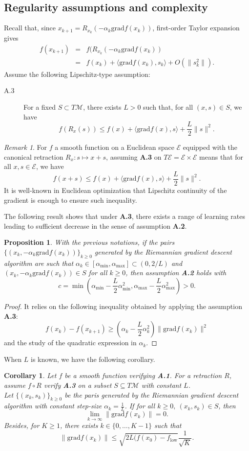 \documentclass[10pt,a4paper]{book}
\theoremstyle{definition}
\theoremstyle{plain}
\newtheorem{prop}{Proposition}[section]
\newtheorem{cor}{Corollary}[section]
\theoremstyle{remark}
\newtheorem{rmk}{Remark}[section]
\newcommand{\grad}{\textrm{grad}}
\newcommand{\E}{\mathcal{E}}
\newcommand \M {\mathcal{M}}
\begin{document}
\subsection{Regularity assumptions and complexity}
Recall that, since $x_{k+1}=R_{x_k}(-\alpha_k \grad f(x_k))$, first-order Taylor expansion gives
\begin{eqnarray*}
f(x_{k+1})&=&f(R_{x_k}(-\alpha_k \grad f(x_k))\\
&=&f(x_k)+\langle \grad f(x_k),s_k\rangle +O(\|s_k^2\|).
\end{eqnarray*}
Assume the following Lipschitz-type assumption:
\begin{description}
\item[A.3] For a fixed $S\subset T\M$, there exists $L>0$ such that, for all $(x,s)\in S$, we have
$$f(R_x(s))\leq f(x)+\langle \grad f(x),s\rangle +\frac{L}{2}\|s\|^2.$$ 
\end{description}
\begin{rmk}
For $f$ a smooth function on a Euclidean space $\E$ equipped with the canonical retraction $R_x:s\mapsto x+s$, assuming \textbf{A.3} on $T\E=\E\times \E$ means that for all $x,s\in \E$, we have
$$f(x+s)\leq f(x)+\langle \grad f(x),s\rangle +\frac{L}{2}\|s\|^2.$$
It is well-known in Euclidean optimization that Lipschitz continuity of the gradient is enough to ensure such inequality. 
\end{rmk}



The following result shows that under \textbf{A.3}, there exists a range of learning rates leading to sufficient decrease in the sense of assumption \textbf{A.2}.
\begin{prop}
With the previous notations, if the pairs $\{(x_k,-\alpha_k \grad f(x_k))\}_{k\ge 0}$ generated by the Riemannian gradient descent algorithm are such that $\alpha_k \in [\alpha_{\min},\alpha_{\max}]\subset (0,2/L)$ and $(x_k,-\alpha_k \grad f(x_k))\in S$ for all $k\ge 0$, then assumption \textbf{A.2} holds with
$$c=\min\left(\alpha_{\min}-\frac{L}{2}\alpha_{\min}^2,\alpha_{\max}-\frac{L}{2}\alpha_{\max}^2\right)>0.$$
\end{prop}
\begin{proof}
It relies on the following inequality obtained by applying the assumption \textbf{A.3}:
$$f(x_k)-f(x_{k+1})\ge \left(\alpha_k-\frac{L}{2}\alpha_k^2\right)\|\grad f(x_k)\|^2$$
and the study of the quadratic expression in $\alpha_k$.
\end{proof}
When $L$ is known, we have the following corollary.
\begin{cor}
Let $f$ be a smooth function verifying \textbf{A.1}. For a retraction $R$, assume $f\circ R$ verify \textbf{A.3} on a subset $S\subseteq T\M$ with constant $L$. \\ Let $\{(x_k,s_k)\}_{k\ge 0}$ be the paris generated by the Riemannian gradient descent algorithm with \emph{constant step-size} $\alpha_k=\frac{1}{L}$. If for all $k\ge 0,~(x_k,s_k)\in S$, then
$$\lim_{k\to\infty}\|\grad f(x_k)\|=0.$$
Besides, for $K\ge 1$, there exists $k\in \{0,\dots, K-1\}$ such that
$$\|\grad f(x_k)\|\leq \sqrt{2L(f(x_0)-f_{\text{low}}}\frac{1}{\sqrt{K}}.$$
\end{cor}
\end{document}
